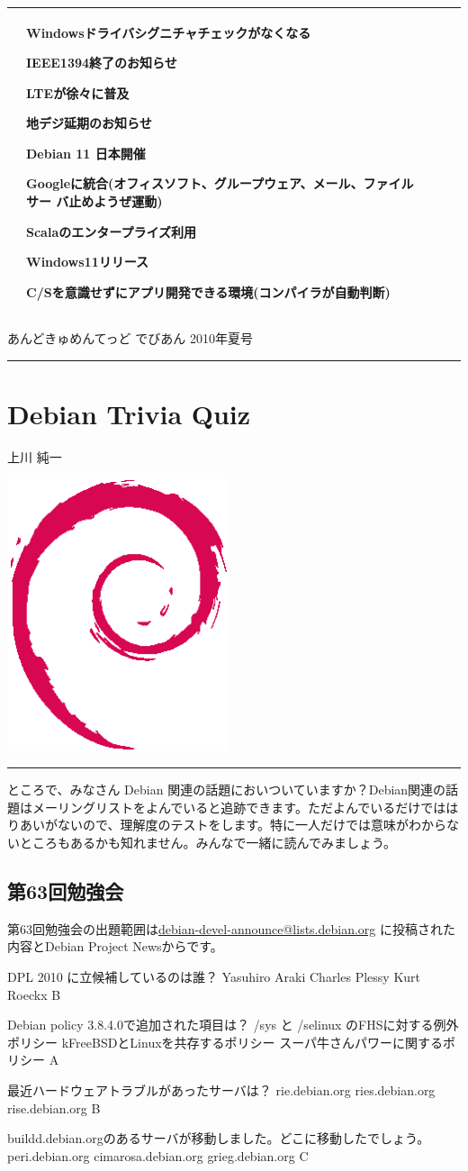 \documentclass[mingoth,a4paper]{jsarticle}
\renewcommand{\dancersection}[2]{%
\newpage
あんどきゅめんてっど でびあん 2010年夏号
%
\vspace{0.1mm}\\
{\color{dancerlightblue}\rule{\hsize}{2mm}}

%
%
\begin{minipage}[t]{0.6\hsize}
\color{dancerdarkblue}
\vspace{1cm}
\section{#1}
\hfill{}#2\\
\end{minipage}
\begin{minipage}[t]{0.4\hsize}
\vspace{-2cm}
\hfill{}\includegraphics[height=8cm]{image200502/openlogo-nd.eps}\\
\vspace{-5cm}
\end{minipage}
%
%
{\color{dancerdarkblue}\rule{0.74\hsize}{2mm}}
%
\vspace{2cm}
}
\begin{document}
{\begin{tabular}[t]{|p{5em}|p{11em}|p{14em}|p{12em}|p{5em}|}
&
Windowsドライバシグニチャチェックがなくなる

IEEE1394終了のお知らせ

LTEが徐々に普及

地デジ延期のお知らせ

Debian 11 日本開催

Googleに統合(オフィスソフト、グループウェア、メール、ファイルサー
		 バ止めようぜ運動)

Scalaのエンタープライズ利用

Windows11リリース

C/Sを意識せずにアプリ開発できる環境(コンパイラが自動判断)

\\

\hline
\end{tabular}

}

\clearpage

\newpage

\dancersection{Debian Trivia Quiz}{上川 純一}

ところで、みなさん Debian 関連の話題においついていますか？Debian関連の話
題はメーリングリストをよんでいると追跡できます。ただよんでいるだけではは
りあいがないので、理解度のテストをします。特に一人だけでは意味がわからな
いところもあるかも知れません。みんなで一緒に読んでみましょう。

 \subsection{第63回勉強会}
第63回勉強会の出題範囲は\url{debian-devel-announce@lists.debian.org} に投稿された内容とDebian Project Newsからです。

\santaku
{DPL 2010 に立候補しているのは誰？}
{Yasuhiro Araki} %
{Charles Plessy}
{Kurt Roeckx}
{B}

\santaku
{Debian policy 3.8.4.0で追加された項目は？}
{/sys と /selinux のFHSに対する例外ポリシー}
{kFreeBSDとLinuxを共存するポリシー}
{スーパ牛さんパワーに関するポリシー}
{A}

\santaku
{最近ハードウェアトラブルがあったサーバは？}
{rie.debian.org}
{ries.debian.org} %
{rise.debian.org }
{B}

\santaku
{buildd.debian.orgのあるサーバが移動しました。どこに移動したでしょう。}
{peri.debian.org} %
{cimarosa.debian.org} %
{grieg.debian.org} %
{C}
\end{document}
